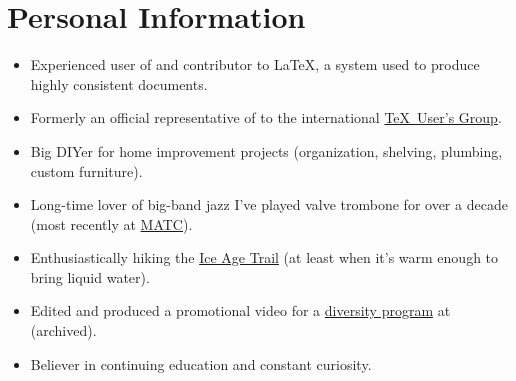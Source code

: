 \documentclass{simplecv}
\newif\ifinterests
\begin{document}
\section{Personal Information}
\begin{itemize}
\item Experienced user of and contributor to \LaTeX, a system
  used to produce highly consistent documents.
\item Formerly an official representative of
  \href{http://meta.tex.stackexchange.com/a/4174/17423}{}
  to the international \href{http://www.tug.org}{\TeX\ User's Group}.
\item Big DIYer for home improvement projects (organization,
  shelving, plumbing, custom furniture).
\item Long-time lover of big-band jazz \Dash I've played valve
  trombone for over a decade (most recently at
  \href{https://madisoncollege.edu}{MATC}).
\item Enthusiastically hiking the
  \href{https://www.iceagetrail.org}{Ice Age Trail} (at least when
  it's warm enough to bring liquid water).
\item Edited and produced a promotional video for a \href{%
    http://www.smcm.edu/academics/desousa-brent-scholars/}{diversity program}
  at  (archived).
\item Believer in continuing education and constant curiosity.
\end{itemize}

\vfill

\ifinterests
\section{Relevant Interests}
I have several interests in which I have no formal training,
  but have some experience.
These include:

\bigskip

\begin{minipage}[t]{0.55\linewidth}
  \begin{itemize}\RaggedRight
  \item structured documents, especially in the context of $\downarrow$
  \item literate programming \Dash a documentation-centric paradigm
    for software development and reproducible research,
  \end{itemize}
\end{minipage}
\hfill
\begin{minipage}[t]{0.4\linewidth}
  \begin{itemize}
  \item custom electronics and embedded systems,
  \item language design/development, and
  \item typography.
  \end{itemize}
\end{minipage}
\vfill

\centering
Additional details on my projects and interests can be found at
  \url{https://www.seanallred.com}.
\fi
\vfill
\end{document}
